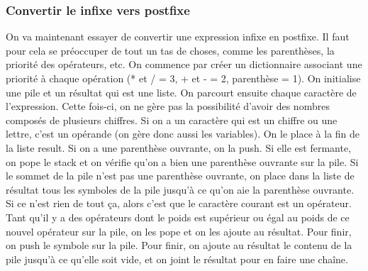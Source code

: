 \documentclass[10pt]{article}
\begin{document}
\subsubsection{Convertir le infixe vers postfixe} 
On va maintenant essayer de convertir une expression infixe en postfixe. Il faut pour cela se préoccuper de tout un tas de choses, comme les parenthèses, la priorité des opérateurs, etc. 
\newline \newline 
On commence par créer un dictionnaire associant une priorité à chaque opération (* et / = 3, + et - = 2, parenthèse = 1). On initialise une pile et un résultat qui est une liste. 
\newline \newline 
On parcourt ensuite chaque caractère de l'expression. Cette fois-ci, on ne gère pas la possibilité d'avoir des nombres composés de plusieurs chiffres. 
\newline \newline 
Si on a un caractère qui est un chiffre ou une lettre, c'est un opérande (on gère donc aussi les variables). On le place à la fin de la liste result. Si on a une parenthèse ouvrante, on la push. Si elle est fermante, on pope le stack et on vérifie qu'on a bien une parenthèse ouvrante sur la pile. Si le sommet de la pile n'est pas une parenthèse ouvrante, on place dans la liste de résultat tous les symboles de la pile jusqu'à ce qu'on aie la parenthèse ouvrante. 
\newline \newline 
Si ce n'est rien de tout ça, alors c'est que le caractère courant est un opérateur. Tant qu'il y a des opérateurs dont le poids est supérieur ou égal au poids de ce nouvel opérateur sur la pile, on les pope et on les ajoute au résultat. Pour finir, on push le symbole sur la pile. 
\newline \newline 
Pour finir, on ajoute au résultat le contenu de la pile jusqu'à ce qu'elle soit vide, et on joint le résultat pour en faire une chaîne.
\end{document}
